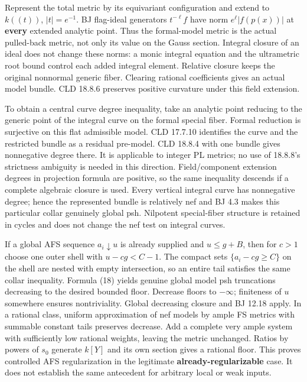 \documentclass[
  11pt,
]{article}
\begin{document}
Represent the total metric by its equivariant configuration and extend
to \(k((t))\), \(|t|=e^{-1}\). BJ flag-ideal generators \(t^{-\ell}f\)
have norm \(e^\ell|f(p(x))|\) at \textbf{every} extended analytic point.
Thus the formal-model metric is the actual pulled-back metric, not only
its value on the Gauss section. Integral closure of an ideal does not
change these norms: a monic integral equation and the ultrametric root
bound control each added integral element. Relative closure keeps the
original nonnormal generic fiber. Clearing rational coefficients gives
an actual model bundle. CLD 18.8.6 preserves positive curvature under
this field extension.

To obtain a central curve degree inequality, take an analytic point
reducing to the generic point of the integral curve on the formal
special fiber. Formal reduction is surjective on this flat admissible
model. CLD 17.7.10 identifies the curve and the restricted bundle as a
residual pre-model. CLD 18.8.4 with one bundle gives nonnegative degree
there. It is applicable to integer PL metrics; no use of 18.8.8's
strictness ambiguity is needed in this direction. Field/component
extension degrees in projection formula are positive, so the same
inequality descends if a complete algebraic closure is used. Every
vertical integral curve has nonnegative degree; hence the represented
bundle is relatively nef and BJ 4.3 makes this particular collar
genuinely global psh. Nilpotent special-fiber structure is retained in
cycles and does not change the nef test on integral curves.

If a global AFS sequence \(a_i\downarrow u\) is already supplied and
\(u\le g+B\), then for \(c>1\) choose one outer shell with \(u-cg<C-1\).
The compact sets \(\{a_i-cg\ge C\}\) on the shell are nested with empty
intersection, so an entire tail satisfies the same collar inequality.
Formula (18) yields genuine global model psh truncations decreasing to
the desired bounded floor. Decrease floors to \(-\infty\); finiteness of
\(u\) somewhere ensures nontriviality. Global decreasing closure and BJ
12.18 apply. In a rational class, uniform approximation of nef models by
ample FS metrics with summable constant tails preserves decrease. Add a
complete very ample system with sufficiently low rational weights,
leaving the metric unchanged. Ratios by powers of \(s_0\) generate
\(k[Y]\) and its own section gives a rational floor. This proves
controlled AFS regularization in the legitimate
\textbf{already-regularizable} case. It does not establish the same
antecedent for arbitrary local or weak inputs.
\end{document}

